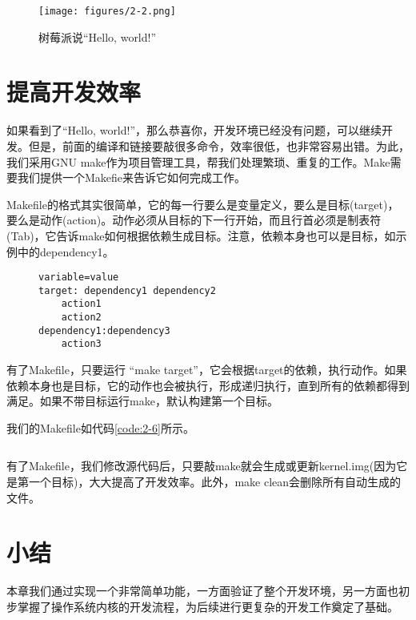 \documentclass[main.tex]{subfiles}
\begin{document}
\begin{CJK*}{UTF8}{song}
\begin{figure}[htp]
\centering
\texttt{[image: figures/2-2.png]}
\caption{树莓派说“Hello, world!”}
\label{figure:2-2}
\end{figure}

\section{提高开发效率}
\justify
如果看到了“Hello, world!”，那么恭喜你，开发环境已经没有问题，可以继续开发。但是，前面的编译和链接要敲很多命令，效率很低，也非常容易出错。为此，我们采用GNU make作为项目管理工具，帮我们处理繁琐、重复的工作。Make需要我们提供一个Makefie来告诉它如何完成工作。

\par
Makefile的格式其实很简单，它的每一行要么是变量定义，要么是目标(target)，要么是动作(action)。动作必须从目标的下一行开始，而且行首必须是制表符(Tab)，它告诉make如何根据依赖生成目标。注意，依赖本身也可以是目标，如示例中的dependency1。
\begin{figure}[htp]
\centering
\begin{minipage}{0.4\textwidth}
\begin{verbatim}
variable=value
target: dependency1 dependency2
    action1
    action2
dependency1:dependency3
    action3
\end{verbatim}
\end{minipage}
\end{figure}
\par
有了Makefile，只要运行 “make target”，它会根据target的依赖，执行动作。如果依赖本身也是目标，它的动作也会被执行，形成递归执行，直到所有的依赖都得到满足。如果不带目标运行make，默认构建第一个目标。

\par
我们的Makefile如代码\ref{code:2-6}所示。
\begin{code}
\label{code:2-6}
\inputminted[linenos,numbersep=5pt,frame=lines,framesep=2mm]{make}{src/chapter02/kernel/Makefile}
\end{code}
有了Makefile，我们修改源代码后，只要敲make就会生成或更新kernel.img(因为它是第一个目标)，大大提高了开发效率。此外，make clean会删除所有自动生成的文件。

\section{小结}
本章我们通过实现一个非常简单功能，一方面验证了整个开发环境，另一方面也初步掌握了操作系统内核的开发流程，为后续进行更复杂的开发工作奠定了基础。

\iffalse
    \section{调试}
    为了方便调试，经常需要输出一些格式化的数据，为此我们找了第三方的函数snprintf【】来实现格式化输出的功能。注意，该函数不支持浮点数的格式化输出。

    \inputminted[linenos,numbersep=5pt,frame=lines,framesep=2mm]{c}{src/chapter02/kernel/printk.c}
\fi

\clearpage
\ifxetex\else\end{CJK*}\fi
\end{document}
